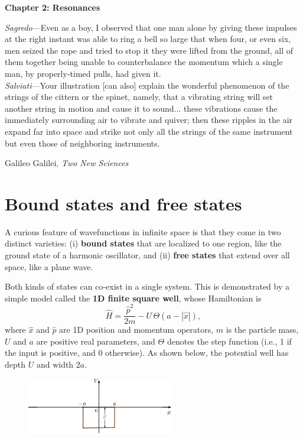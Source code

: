 \documentclass[pra,12pt]{revtex4-2}
\begin{document}
\setcounter{page}{19}

\setlength{\epigraphwidth}{0.7\textwidth}

\begin{center}
{\Large \textbf{Chapter 2: Resonances}}
\end{center}

\epigraph{
\textit{Sagredo}---Even as a boy, I observed that one man alone by giving these impulses at the right instant was able to ring a bell so large that when four, or even six, men seized the rope and tried to stop it they were lifted from the ground, all of them together being unable to counterbalance the momentum which a single man, by properly-timed pulls, had given it. \\ \vskip0.1in
\textit{Salviati}---Your illustration [can also] explain the wonderful phenomenon of the strings of the cittern or the spinet, namely, that a vibrating string will set another string in motion and cause it to sound... these vibrations cause the immediately surrounding air to vibrate and quiver; then these ripples in the air expand far into space and strike not only all the strings of the same instrument but even those of neighboring instruments.}{Galileo Galilei, \textit{Two New Sciences}}

\section{Bound states and free states}

A curious feature of wavefunctions in infinite space is that they come
in two distinct varieties: (i) \textbf{bound states} that are
localized to one region, like the ground state of a harmonic
oscillator, and (ii) \textbf{free states} that extend over all space,
like a plane wave.

Both kinds of states can co-exist in a single system.  This is
demonstrated by a simple model called the \textbf{1D finite square
  well}, whose Hamiltonian is
\begin{equation}
  \hat{H} = \frac{\hat{p}^2}{2m} - U \,\Theta(a -|\hat{x}|),
\end{equation}
where $\hat{x}$ and $\hat{p}$ are 1D position and momentum operators,
$m$ is the particle mass, $U$ and $a$ are positive real parameters,
and $\Theta$ denotes the step function (i.e., 1 if the input is
positive, and 0 otherwise).  As shown below, the potential well has
depth $U$ and width $2a$.

\begin{figure}[h]
  \centering\includegraphics[width=0.57\textwidth]{squarewell}
\end{figure}
\end{document}
